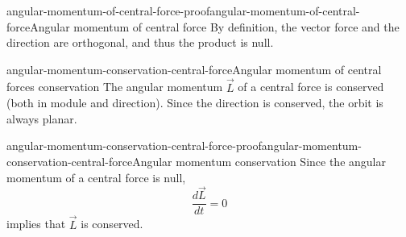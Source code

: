 \documentclass[preview]{standalone}
\begin{document}
\begin{snippetproof}{angular-momentum-of-central-force-proof}{angular-momentum-of-central-force}{Angular momentum of central force}
    By definition, the vector force and the direction are orthogonal, and thus the product is null.
\end{snippetproof}

\begin{snippetcorollary}{angular-momentum-conservation-central-force}{Angular momentum of central forces conservation}
    The angular momentum \(\vec{L}\) of a central force is conserved (both in module and direction).
    Since the direction is conserved, the orbit is always planar.
\end{snippetcorollary}

\begin{snippetproof}{angular-momentum-conservation-central-force-proof}{angular-momentum-conservation-central-force}{Angular momentum conservation}
    Since the angular momentum of a central force is null,
    \[
        \frac{d\vec{L}}{dt} = 0
    \]
    implies that \(\vec{L}\) is conserved.
\end{snippetproof}

\end{document}
